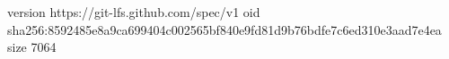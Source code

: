 version https://git-lfs.github.com/spec/v1
oid sha256:8592485e8a9ca699404c002565bf840e9fd81d9b76bdfe7c6ed310e3aad7e4ea
size 7064
